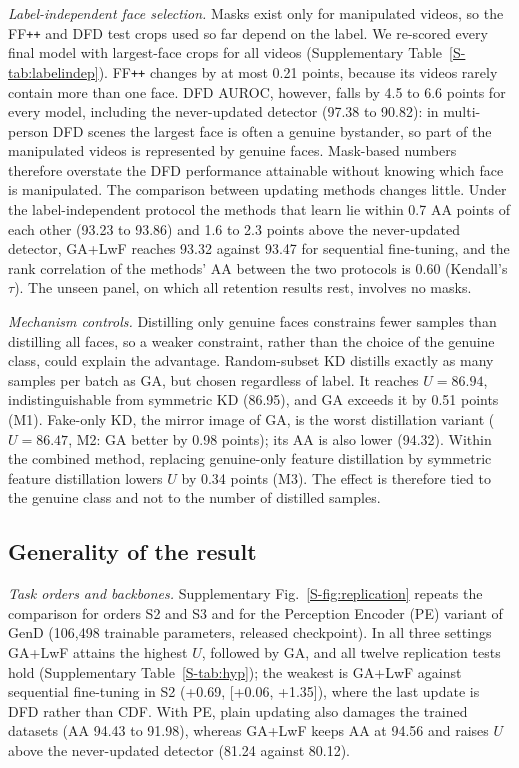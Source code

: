 \documentclass[journal]{IEEEtran}
\newcommand{\ffpp}{FF\texttt{++}}
\begin{document}
\textit{Label-independent face selection.}\label{sec:labelindep} Masks exist only for manipulated videos, so the \ffpp{} and DFD test crops used so far depend on the label. We re-scored every final model with largest-face crops for all videos (Supplementary Table~\ref{S-tab:labelindep}). \ffpp{} changes by at most 0.21 points, because its videos rarely contain more than one face. DFD AUROC, however, falls by 4.5 to 6.6 points for every model, including the never-updated detector (97.38 to 90.82): in multi-person DFD scenes the largest face is often a genuine bystander, so part of the manipulated videos is represented by genuine faces. Mask-based numbers therefore overstate the DFD performance attainable without knowing which face is manipulated. The comparison between updating methods changes little. Under the label-independent protocol the methods that learn lie within 0.7 AA points of each other (93.23 to 93.86) and 1.6 to 2.3 points above the never-updated detector, GA+LwF reaches 93.32 against 93.47 for sequential fine-tuning, and the rank correlation of the methods' AA between the two protocols is 0.60 (Kendall's $\tau$). The unseen panel, on which all retention results rest, involves no masks.

\textit{Mechanism controls.} Distilling only genuine faces constrains fewer samples than distilling all faces, so a weaker constraint, rather than the choice of the genuine class, could explain the advantage. Random-subset KD distills exactly as many samples per batch as GA, but chosen regardless of label. It reaches $U=86.94$, indistinguishable from symmetric KD (86.95), and GA exceeds it by 0.51 points (M1). Fake-only KD, the mirror image of GA, is the worst distillation variant ($U=86.47$, M2: GA better by 0.98 points); its AA is also lower (94.32). Within the combined method, replacing genuine-only feature distillation by symmetric feature distillation lowers $U$ by 0.34 points (M3). The effect is therefore tied to the genuine class and not to the number of distilled samples.

\subsection{Generality of the result}
\textit{Task orders and backbones.} Supplementary Fig.~\ref{S-fig:replication} repeats the comparison for orders S2 and S3 and for the Perception Encoder (PE) variant of GenD (106{,}498 trainable parameters, released checkpoint). In all three settings GA+LwF attains the highest $U$, followed by GA, and all twelve replication tests hold (Supplementary Table~\ref{S-tab:hyp}); the weakest is GA+LwF against sequential fine-tuning in S2 (+0.69, [+0.06, +1.35]), where the last update is DFD rather than CDF. With PE, plain updating also damages the trained datasets (AA 94.43 to 91.98), whereas GA+LwF keeps AA at 94.56 and raises $U$ above the never-updated detector (81.24 against 80.12).
\end{document}
